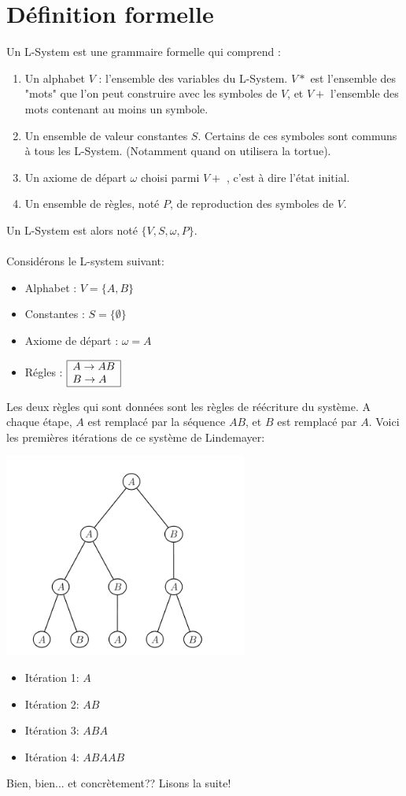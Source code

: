 \section{Définition formelle}
\noindent
Un L-System est une grammaire formelle qui comprend :
\begin{enumerate}
 \item Un alphabet $V$ : l'ensemble des variables du L-System. $V *$ est l'ensemble des "mots" que l'on peut construire avec les symboles de $V$, et $V +$ l'ensemble des mots contenant au moins un symbole.
 \item Un ensemble de valeur constantes $S$. Certains de ces symboles sont communs à tous les L-System. (Notamment quand on utilisera la tortue).
  \item Un axiome de départ $\omega$ choisi parmi $V +$ , c'est à dire l'état initial.
 \item Un ensemble de règles, noté $P$, de reproduction des symboles de $V$.
\end{enumerate}
Un L-System est alors noté $\{V,S,\omega,P\}$.\\ \\
Considérons le L-system suivant:
\begin{itemize}
 \item Alphabet : $V = \{A, B\}$
 \item Constantes : $S = \{\emptyset\}$
 \item Axiome de départ : $\omega = A$
 \item Régles : $\begin{array}{|l|}
\hline
A \rightarrow AB \\
B \rightarrow A \\ 
\hline
\end{array}
$
\end{itemize}
Les deux règles qui sont données sont les règles de réécriture du système. A chaque étape, $A$ est remplacé par la séquence $AB$, et $B$ est remplacé par $A$. Voici les premières itérations de ce système de Lindemayer:
\begin{center}
\includegraphics[width=8cm]{images/linden-arbre.png}
\end{center}
\begin{itemize}
\item Itération 1: $A$
\item Itération 2: $AB$
\item Itération 3: $ABA$
\item Itération 4: $ABAAB$
\end{itemize}
\vspace*{0.2cm}
Bien, bien... et concrètement?? Lisons la suite!
